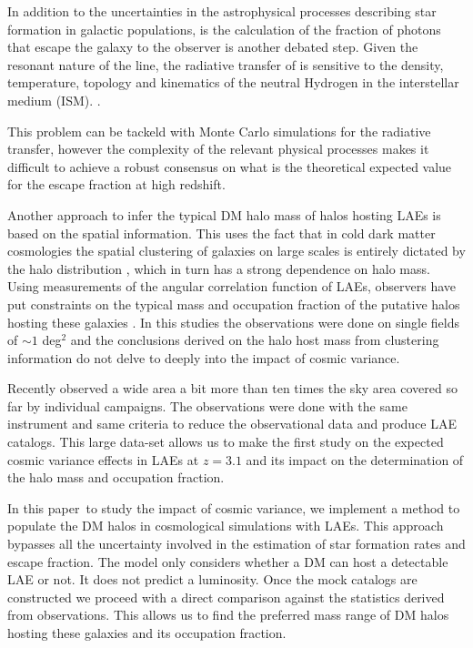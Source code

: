\documentclass[usenatbib]{mn2e}
\newcommand{\documentname}{paper~}
\newcommand{\ly}{{\ifmmode{{\rm Ly}\alpha}\else{Ly$\alpha$~}\fi}}
\begin{document}
In addition to the uncertainties in the astrophysical processes describing
star formation in galactic populations, is the calculation of the fraction of \ly photons
that escape the galaxy to the observer is another debated step. Given the resonant nature of
the \ly line, the radiative transfer of \ly is sensitive to the
density, temperature, topology and kinematics of the neutral Hydrogen
in the interstellar medium (ISM). \citep{Neufeld1991,ForeroRomero2011,
  Dijkstra2012,Laursen2013,Orsi2012}.  

This problem can be tackeld with Monte Carlo simulations for the
radiative transfer, however the complexity of the relevant physical
processes makes it difficult to achieve a robust consensus on what is
the theoretical expected value for the \ly escape fraction
at high redshift. 

Another approach to infer the typical DM halo mass of halos hosting
LAEs is based on the spatial information. This uses the fact that in cold
dark matter cosmologies the spatial clustering of galaxies on large
scales is entirely dictated by the halo distribution
\citep{Colberg00}, which in turn has a strong dependence on halo
mass. Using measurements of the angular correlation function of LAEs,
observers have put constraints on the typical mass and occupation
fraction of the putative halos hosting these galaxies
\citep{Hayashino2004,Gawiser07,Nilsson2007,Ouchi2010}. In this
studies the observations were done on single fields of $\sim 1$
deg$^{2}$ and the conclusions derived on the halo host mass from
clustering information do not delve to deeply into the impact of
cosmic variance.

Recently \cite{Yamada2012} observed a wide area a bit more than ten
times the sky area covered so far by individual campaigns. The
observations were done with the same instrument and same criteria to
reduce the observational data and produce LAE catalogs. This large
data-set allows us to make the first study on the expected cosmic
variance effects in LAEs at $z=3.1$ and its impact on the
determination of the halo mass and occupation fraction. 


In this \documentname to study the impact of cosmic variance,
we implement a method to populate the DM halos in cosmological
simulations with LAEs. This approach bypasses all the uncertainty
involved in the estimation of star formation rates and \ly escape
fraction. The model only considers whether a DM can host a
detectable LAE or not. It does not predict a \ly  luminosity. Once the
mock catalogs are constructed  we proceed with a direct comparison
against the statistics derived from observations. This allows us 
to find the preferred mass range of DM halos hosting these galaxies
and its occupation fraction.
\end{document}
